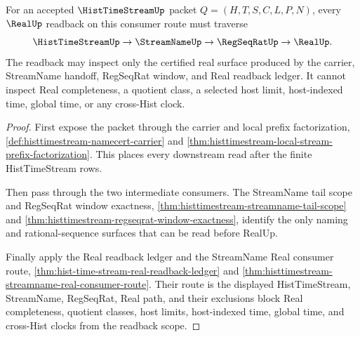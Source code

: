 \begin{theorem}
\label{thm:histtimestream-real-readback-scope-lock}
For an accepted $\HistTimeStreamUp$ packet $Q=(H,T,S,C,L,P,N)$, every $\RealUp$ readback on this consumer route must traverse
$$
\HistTimeStreamUp \to \StreamNameUp \to \RegSeqRatUp \to \RealUp .
$$
The readback may inspect only the certified real surface produced by the carrier, StreamName handoff, RegSeqRat window, and Real readback ledger. It cannot inspect Real completeness, a quotient class, a selected host limit, host-indexed time, global time, or any cross-Hist clock.
\end{theorem}
\begin{proof}
First expose the packet through the carrier and local prefix factorization, \autoref{def:histtimestream-namecert-carrier} and \autoref{thm:histtimestream-local-stream-prefix-factorization}. This places every downstream read after the finite HistTimeStream rows.

Then pass through the two intermediate consumers. The StreamName tail scope and RegSeqRat window exactness, \autoref{thm:histtimestream-streamname-tail-scope} and \autoref{thm:histtimestream-regseqrat-window-exactness}, identify the only naming and rational-sequence surfaces that can be read before RealUp.

Finally apply the Real readback ledger and the StreamName Real consumer route, \autoref{thm:hist-time-stream-real-readback-ledger} and \autoref{thm:histtimestream-streamname-real-consumer-route}. Their route is the displayed HistTimeStream, StreamName, RegSeqRat, Real path, and their exclusions block Real completeness, quotient classes, host limits, host-indexed time, global time, and cross-Hist clocks from the readback scope.
\end{proof}

